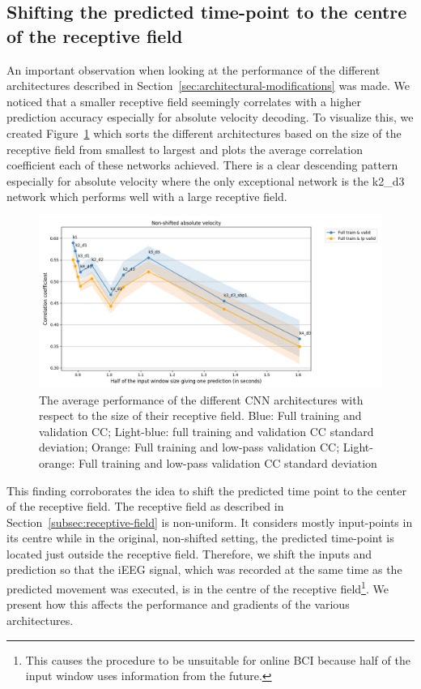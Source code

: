\subsection{Shifting the predicted time-point to the centre of the receptive field}\label{subsec:shifting-the-predicted-time-point-to-the-centre-of-the-receptive-field}
An important observation when looking at the performance of the different architectures described in Section~\ref{sec:architectural-modifications} was made.
We noticed that a smaller receptive field seemingly correlates with a higher prediction accuracy especially for absolute velocity decoding.
To visualize this, we created Figure~\ref{fig:figure-distance} which sorts the different architectures based on the size of the receptive field from smallest to largest and plots the average correlation coefficient each of these networks achieved.
There is a clear descending pattern especially for absolute velocity where the only exceptional network is the k2\_d3 network which performs well with a large receptive field.


\begin{figure}[!htbp]
\centering
   \includegraphics[width=1\linewidth]{img/ch4/distance-shifted-performance-absVel}
   \caption{The average performance of the different CNN architectures with respect to the size of their receptive field. Blue: Full training and validation CC; Light-blue: full training and validation CC standard deviation; Orange: Full training and low-pass validation CC; Light-orange: Full training and low-pass validation CC standard deviation}
   \label{fig:figure-distance}
\end{figure}

This finding corroborates the idea to shift the predicted time point to the center of the receptive field.
The receptive field as described in Section~\ref{subsec:receptive-field} is non-uniform.
It considers mostly input-points in its centre while in the original, non-shifted setting, the predicted time-point is located just outside the receptive field.
Therefore, we shift the inputs and prediction so that the iEEG signal, which was recorded at the same time as the predicted movement was executed, is in the centre of the receptive field\footnote{This causes the procedure to be unsuitable for online BCI because half of the input window uses information from the future.}. 
We present how this affects the performance and gradients of the various architectures.

